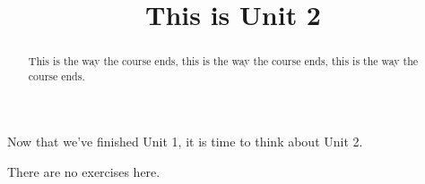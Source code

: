\documentclass{ximera}
\title{This is Unit 2}
\begin{document}
\begin{abstract}
This is the way the course ends, this is the way the course ends, this is the way the course ends.
\end{abstract}

Now that we've finished Unit 1, it is time to think about Unit 2.


There are no exercises here.
\end{document}
